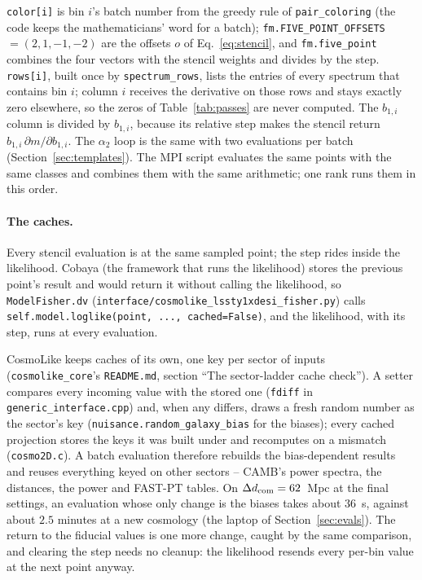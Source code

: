 \documentclass[11pt]{article}
\newcommand{\us}{\_\allowbreak}
\begin{document}
\noindent \texttt{color[i]} is bin $i$'s batch number from the greedy
rule of \texttt{pair\us coloring} (the code keeps the mathematicians'
word for a batch); \texttt{fm.FIVE\us POINT\us OFFSETS}
$= (2, 1, -1, -2)$ are the offsets $o$ of Eq.~\eqref{eq:stencil}, and
\texttt{fm.five\us point} combines the four vectors with the stencil
weights and divides by the step.  \texttt{rows[i]}, built once by
\texttt{spectrum\us rows}, lists the entries of every spectrum that
contains bin $i$; column $i$ receives the derivative on those rows and
stays exactly zero elsewhere, so the zeros of Table~\ref{tab:passes}
are never computed.  The $b_{1,i}$ column is divided by $b_{1,i}$,
because its relative step makes the stencil return
$b_{1,i}\,\partial m/\partial b_{1,i}$.  The $\alpha_2$ loop is the
same with two evaluations per batch (Section~\ref{sec:templates}).
The MPI script evaluates the same points with the same classes and
combines them with the same arithmetic; one rank runs them in this
order.

\paragraph{The caches.}
Every stencil evaluation is at the same sampled point; the step rides
inside the likelihood.  Cobaya (the framework that runs the
likelihood)
stores the previous point's result and would return it without calling
the likelihood, so \texttt{ModelFisher.dv}
(\texttt{interface/cosmolike\us lssty1xdesi\us fisher.py}) calls
\texttt{self.model.loglike(point, ..., cached=False)}, and the
likelihood, with its step, runs at every evaluation.

CosmoLike keeps caches of its own, one key per sector of inputs
(\texttt{cosmolike\us core}'s \texttt{README.md}, section ``The
sector-ladder cache check'').  A setter compares every incoming value
with the stored one (\texttt{fdiff} in
\texttt{generic\us interface.cpp}) and, when any differs, draws a
fresh random number as the sector's key
(\texttt{nuisance.random\us galaxy\us bias} for the biases); every
cached projection stores the keys it was built under and recomputes on
a mismatch (\texttt{cosmo2D.c}).  A batch evaluation therefore
rebuilds the bias-dependent results and reuses everything keyed on
other sectors -- CAMB's power spectra, the distances, the power and
FAST-PT tables.  On $\Delta d_{\rm com} = 62$~Mpc at the final
settings, an evaluation whose only change is the biases takes about
$36$~s, against about $2.5$ minutes at a new cosmology (the laptop of
Section~\ref{sec:evals}).  The return to the fiducial values is one
more change, caught by the same comparison, and clearing the step
needs no cleanup: the likelihood resends every
per-bin value at the next point anyway.
\end{document}
